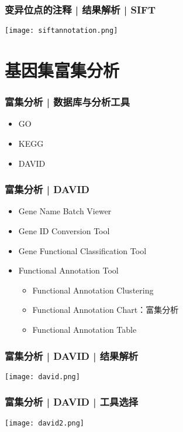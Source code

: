 \begin{frame}
	\frametitle{变异位点的注释 | 结果解析 | SIFT}
		\begin{center}
			\texttt{[image: siftannotation.png]}
		\end{center}
\end{frame}

\section{基因集富集分析}
\begin{frame}
	\frametitle{富集分析 | 数据库与分析工具}
	\begin{itemize}
		\item GO
		\item KEGG
		\item DAVID
	\end{itemize}
\end{frame}

\begin{frame}
	\frametitle{富集分析 | DAVID}
	\begin{itemize}
		\item Gene Name Batch Viewer
		\item Gene ID Conversion Tool
		\item Gene Functional Classification Tool
		\item Functional Annotation Tool
		\begin{itemize}
			\item Functional Annotation Clustering
			\item Functional Annotation Chart：富集分析
			\item Functional Annotation Table
		\end{itemize}
	\end{itemize}
\end{frame}

\begin{frame}
	\frametitle{富集分析 | DAVID | 结果解析}
	\begin{center}
		\texttt{[image: david.png]}
	\end{center}
\end{frame}

\begin{frame}
	\frametitle{富集分析 | DAVID | 工具选择}
	\begin{center}
		\texttt{[image: david2.png]}
	\end{center}
\end{frame}

